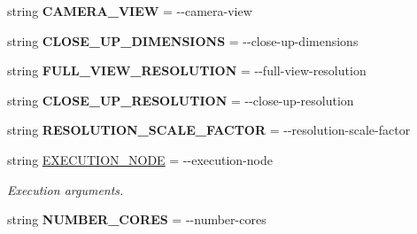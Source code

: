\begin{DoxyCompactItemize}
\item 
string {\bfseries C\+A\+M\+E\+R\+A\+\_\+\+V\+I\+EW} = \textquotesingle{}-\/-\/camera-\/view\textquotesingle{}\hypertarget{classmeshy_1_1neuromorphovis_1_1interface_1_1cli_1_1args_1_1Args_a418ede4a20f6dbaf8ec22f3bcf662206}{}\label{classmeshy_1_1neuromorphovis_1_1interface_1_1cli_1_1args_1_1Args_a418ede4a20f6dbaf8ec22f3bcf662206}

\item 
string {\bfseries C\+L\+O\+S\+E\+\_\+\+U\+P\+\_\+\+D\+I\+M\+E\+N\+S\+I\+O\+NS} = \textquotesingle{}-\/-\/close-\/up-\/dimensions\textquotesingle{}\hypertarget{classmeshy_1_1neuromorphovis_1_1interface_1_1cli_1_1args_1_1Args_a19e0a392c931104adaec7e8702321f4d}{}\label{classmeshy_1_1neuromorphovis_1_1interface_1_1cli_1_1args_1_1Args_a19e0a392c931104adaec7e8702321f4d}

\item 
string {\bfseries F\+U\+L\+L\+\_\+\+V\+I\+E\+W\+\_\+\+R\+E\+S\+O\+L\+U\+T\+I\+ON} = \textquotesingle{}-\/-\/full-\/view-\/resolution\textquotesingle{}\hypertarget{classmeshy_1_1neuromorphovis_1_1interface_1_1cli_1_1args_1_1Args_a457f6ca72f00a1b1bfa8c361d0543af4}{}\label{classmeshy_1_1neuromorphovis_1_1interface_1_1cli_1_1args_1_1Args_a457f6ca72f00a1b1bfa8c361d0543af4}

\item 
string {\bfseries C\+L\+O\+S\+E\+\_\+\+U\+P\+\_\+\+R\+E\+S\+O\+L\+U\+T\+I\+ON} = \textquotesingle{}-\/-\/close-\/up-\/resolution\textquotesingle{}\hypertarget{classmeshy_1_1neuromorphovis_1_1interface_1_1cli_1_1args_1_1Args_aae2d0de92e8953e3e6644195c4ce0124}{}\label{classmeshy_1_1neuromorphovis_1_1interface_1_1cli_1_1args_1_1Args_aae2d0de92e8953e3e6644195c4ce0124}

\item 
string {\bfseries R\+E\+S\+O\+L\+U\+T\+I\+O\+N\+\_\+\+S\+C\+A\+L\+E\+\_\+\+F\+A\+C\+T\+OR} = \textquotesingle{}-\/-\/resolution-\/scale-\/factor\textquotesingle{}\hypertarget{classmeshy_1_1neuromorphovis_1_1interface_1_1cli_1_1args_1_1Args_a0e2ae6ebdef7768120ad332d43e85d8f}{}\label{classmeshy_1_1neuromorphovis_1_1interface_1_1cli_1_1args_1_1Args_a0e2ae6ebdef7768120ad332d43e85d8f}

\item 
string \hyperlink{classmeshy_1_1neuromorphovis_1_1interface_1_1cli_1_1args_1_1Args_aed2b1ef0b4456268c3830fe7220207ab}{E\+X\+E\+C\+U\+T\+I\+O\+N\+\_\+\+N\+O\+DE} = \textquotesingle{}-\/-\/execution-\/node\textquotesingle{}
\begin{DoxyCompactList}\small\item\em Execution arguments. \end{DoxyCompactList}\item 
string {\bfseries N\+U\+M\+B\+E\+R\+\_\+\+C\+O\+R\+ES} = \textquotesingle{}-\/-\/number-\/cores\textquotesingle{}\hypertarget{classmeshy_1_1neuromorphovis_1_1interface_1_1cli_1_1args_1_1Args_ad9c12d0ea92fa346f57d13b686e72131}{}\label{classmeshy_1_1neuromorphovis_1_1interface_1_1cli_1_1args_1_1Args_ad9c12d0ea92fa346f57d13b686e72131}


\end{DoxyCompactItemize}
